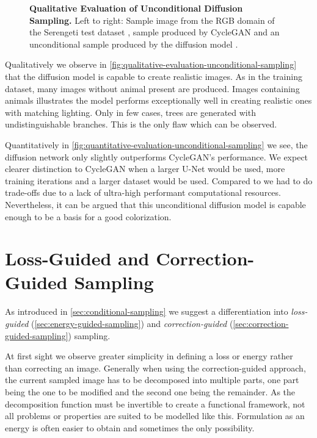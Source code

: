 \begin{figure}[htp!]
\begin{tabularx}{\textwidth}{Y Y Y !{\space} Y Y Y}
    \end{tabularx}
    \caption{
        \textbf{Qualitative Evaluation of Unconditional Diffusion Sampling.} Left to right: Sample image from the RGB domain of the Serengeti test dataset \parencite{serengeti},
        sample produced by CycleGAN \parencite{mehri} and an unconditional sample produced by the diffusion model \parencite{diffusion-beats-gans}.
    }
    \label{fig:qualitative-evaluation-unconditional-sampling}
\end{figure}

Qualitatively we observe in \autoref{fig:qualitative-evaluation-unconditional-sampling} that the diffusion model is capable to create realistic images.
As in the training dataset, many images without animal present are produced.
Images containing animals illustrates the model performs exceptionally well in creating realistic ones with matching lighting.
Only in few cases, trees are generated with undistinguishable branches. This is the only flaw which can be observed.

Quantitatively in \autoref{fig:quantitative-evaluation-unconditional-sampling} we see, the diffusion network only slightly outperforms CycleGAN's performance.
We expect clearer distinction to CycleGAN when a larger U-Net would be used, more training iterations and a larger dataset would be used.
Compared to \textcite{diffusion-beats-gans} we had to do trade-offs due to a lack of ultra-high performant computational resources.
Nevertheless, it can be argued that this unconditional diffusion model is capable enough to be a basis for a good colorization.


\section{Loss-Guided and Correction-Guided Sampling}
As introduced in \autoref{sec:conditional-sampling} we suggest a differentiation into
\textit{loss-guided} (\autoref{sec:energy-guided-sampling}) and \textit{correction-guided} (\autoref{sec:correction-guided-sampling}) sampling.

At first sight we observe greater simplicity in defining a loss or energy rather than correcting an image.
Generally when using the correction-guided approach, the current sampled image has to be decomposed into multiple parts,
one part being the one to be modified and the second one being the remainder.
As the decomposition function must be invertible to create a functional framework, not all problems or properties are suited to be modelled like this.
Formulation as an energy is often easier to obtain and sometimes the only possibility.

